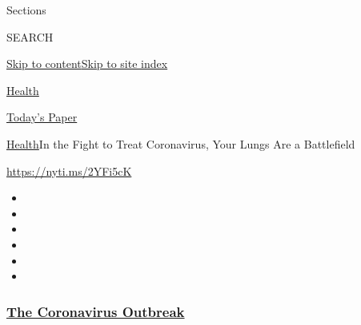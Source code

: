 Sections

SEARCH

\protect\hyperlink{site-content}{Skip to
content}\protect\hyperlink{site-index}{Skip to site index}

\href{https://www.nytimes3xbfgragh.onion/section/health}{Health}

\href{https://myaccount.nytimes3xbfgragh.onion/auth/login?response_type=cookie\&client_id=vi}{}

\href{https://www.nytimes3xbfgragh.onion/section/todayspaper}{Today's
Paper}

\href{/section/health}{Health}\textbar{}In the Fight to Treat
Coronavirus, Your Lungs Are a Battlefield

\url{https://nyti.ms/2YFi5cK}

\begin{itemize}
\item
\item
\item
\item
\item
\item
\end{itemize}

\hypertarget{the-coronavirus-outbreak}{%
\subsubsection{\texorpdfstring{\href{https://www.nytimes3xbfgragh.onion/news-event/coronavirus?name=styln-coronavirus-national\&region=TOP_BANNER\&variant=undefined\&block=storyline_menu_recirc\&action=click\&pgtype=Interactive\&impression_id=a2773010-e38f-11ea-a918-111100de9fdb}{The
Coronavirus
Outbreak}}{The Coronavirus Outbreak}}\label{the-coronavirus-outbreak}}

